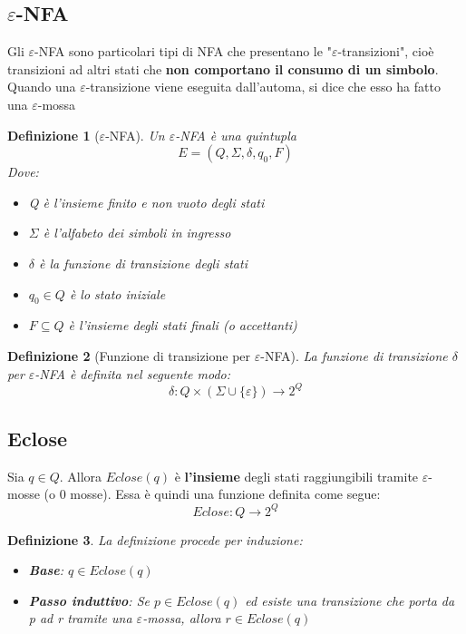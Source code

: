 \documentclass[12pt]{article}
\newtheorem{Definizione}{Definizione}[subsection]
\begin{document}
\subsection{$\varepsilon$-NFA}
Gli $\varepsilon$-NFA sono particolari tipi di NFA che presentano le "$\varepsilon$-transizioni", cioè transizioni ad altri stati che \textbf{non comportano il consumo di un simbolo}. Quando una \newline $\varepsilon$-transizione viene eseguita dall'automa, si dice che esso ha fatto una $\varepsilon$-mossa
\begin{Definizione}[$\varepsilon$-NFA]
Un $\varepsilon$-NFA è una quintupla $$E = (Q, \Sigma, \delta, q_0, F)$$
Dove:
\begin{itemize}
        \item Q è l'insieme finito e non vuoto degli stati
        \item $\Sigma$ è l'alfabeto dei simboli in ingresso
        \item $\delta$ è la funzione di transizione degli stati
        \item $q_0 \in Q$ è lo stato iniziale
        \item $F \subseteq Q$ è l'insieme degli stati finali (o accettanti)
    \end{itemize}
\end{Definizione}
\begin{Definizione}[Funzione di transizione per $\varepsilon$-NFA]
La funzione di transizione $\delta$ per $\varepsilon$-NFA è definita nel seguente modo:
$$\delta: Q \times (\Sigma \cup \{\varepsilon\}) \to 2^Q$$
\end{Definizione}
\subsection{Eclose}
Sia $q \in Q$. Allora $Eclose(q)$ è \textbf{l'insieme} degli stati raggiungibili tramite $\varepsilon$-mosse (o 0 mosse). Essa è quindi una funzione definita come segue:
$$Eclose: Q \to 2^Q$$
\begin{Definizione}
La definizione procede per induzione:
\begin{itemize}
    \item \textbf{Base}: $q \in Eclose(q)$
    \item \textbf{Passo induttivo}: Se $p \in Eclose(q)$ ed esiste una transizione che porta da p ad r tramite una $\varepsilon$-mossa, allora $r \in Eclose(q)$
\end{itemize}
\end{Definizione}
\end{document}
